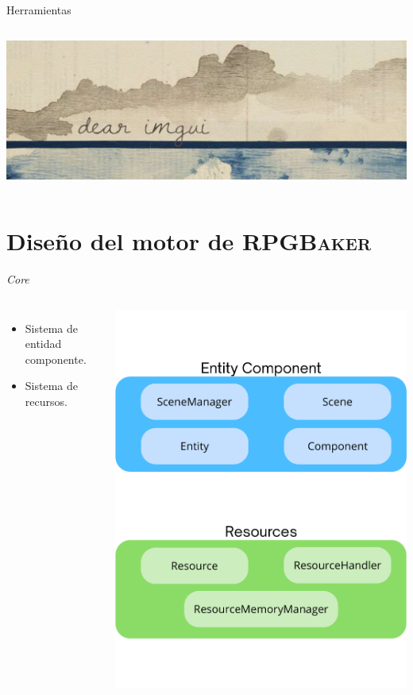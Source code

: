 \documentclass[aspectratio=169]{beamer}
\newcommand{\baker}{%
	\textsc{RPGBaker}%
}
\begin{document}
\begin{frame}{Herramientas}
\begin{columns}
\begin{center}
\begin{columns}
				\includegraphics[width=\textwidth]{imgs/herramientas/dearimgui.pdf}
			\end{columns}
		\end{center}
	\end{columns}
\end{frame}
\section{Diseño del motor de \baker}
\begin{frame}{\textit{Core}}
	\begin{columns}
			\begin{itemize}
				\item Sistema de entidad componente.
				\item Sistema de recursos.
			\end{itemize}
			\includegraphics[height=0.85\textheight]{imgs/motor/Core.pdf}
	\end{columns}
\end{frame}
\end{document}
